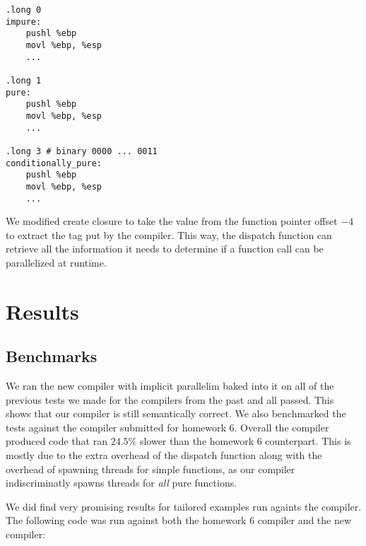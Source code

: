 \documentclass{acm_proc_article-sp}
\begin{document}
\begin{verbatim}
.long 0
impure:
    pushl %ebp
    movl %ebp, %esp
    ...

.long 1
pure:
    pushl %ebp
    movl %ebp, %esp
    ...

.long 3 # binary 0000 ... 0011
conditionally_pure:
    pushl %ebp
    movl %ebp, %esp
    ...
\end{verbatim}

We modified create closure to take the value from the function pointer offset $-4$ to extract the tag
put by the compiler. This way, the dispatch function can retrieve all the information it needs to
determine if a function call can be parallelized at runtime.

\section*{Results}

\subsection*{Benchmarks}
We ran the new compiler with implicit parallelim baked into it on all of the previous tests we made for
the compilers from the past and all passed. This shows that our compiler is still semantically correct.
We also benchmarked the tests against the compiler submitted for homework 6. Overall the compiler produced
code that ran $24.5\%$ slower than the homework 6 counterpart. This is mostly due to the extra overhead
of the dispatch function along with the overhead of spawning threads for simple functions, as our compiler
indiscriminatly spawns threads for \emph{all} pure functions.

We did find very promising results for tailored examples run againts the compiler. The following code was
run against both the homework 6 compiler and the new compiler:
\end{document}
